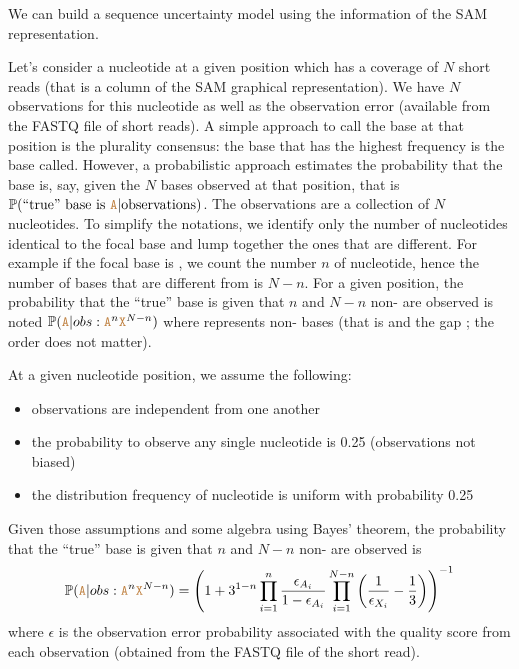 \documentclass[10pt]{article}
\begin{document}
We can build a sequence uncertainty model using the information of the SAM representation. 

Let's consider a nucleotide at a given position which has a coverage of $N$ short reads (that is a column of the SAM graphical representation). 
We have $N$ observations for this nucleotide as well as the observation error (available from the FASTQ file of short reads). 
A simple approach  to call the base at that position is the plurality consensus: the base that has the highest frequency is the base called. 
However, a probabilistic approach estimates the probability that the base is, say,  given the $N$ bases observed at that position, that is $\mathbb{P}(\text{``true'' base is } \texttt{\textcolor{brown}{A}} | \text{observations})$. The observations are a collection of $N$ nucleotides. To simplify the notations, we identify only the number of nucleotides identical to the focal base and lump together the ones that are different. For example if the focal base is , we count the number $n$ of  nucleotide, hence the number of bases that are different from  is $N-n$. 
For a given position, the probability that the ``true'' base is  given that $n$  and $N-n$ non- are observed is noted 
$\mathbb{P}(\texttt{\textcolor{brown}{A}} | obs:\texttt{\textcolor{brown}{A}}^n \texttt{\textcolor{brown}{X}}^{N-n})$
where  represents non- bases (that is  and the gap \sq{-}; the order does not matter).

At a given nucleotide position, we assume the following:
\begin{itemize}
\item observations are independent from one another 
\item the probability to observe any single nucleotide is 0.25 (\ie observations not biased)
\item the distribution frequency of nucleotide is uniform with probability 0.25
\end{itemize}

Given those assumptions and some algebra using Bayes' theorem, the probability that the ``true'' base is  given that $n$  and $N-n$ non- are observed is
\begin{equation}
\mathbb{P}(\texttt{\textcolor{brown}{A}} | obs:\texttt{\textcolor{brown}{A}}^n \texttt{\textcolor{brown}{X}}^{N-n}) = 
\left(
1 + 3^{1-n} \prod_{i=1}^n\frac{\epsilon_{A_i}}{1-\epsilon_{A_i}}
\prod_{i=1}^{N-n}\left(\frac{1}{\epsilon_{X_i}} - \frac{1}{3}\right)
\right)^{-1}
\label{eq:probaSAM}
\end{equation}
where $\epsilon$ is the observation error probability associated with the quality score from each observation (obtained from the FASTQ file of the short read).
\end{document}
